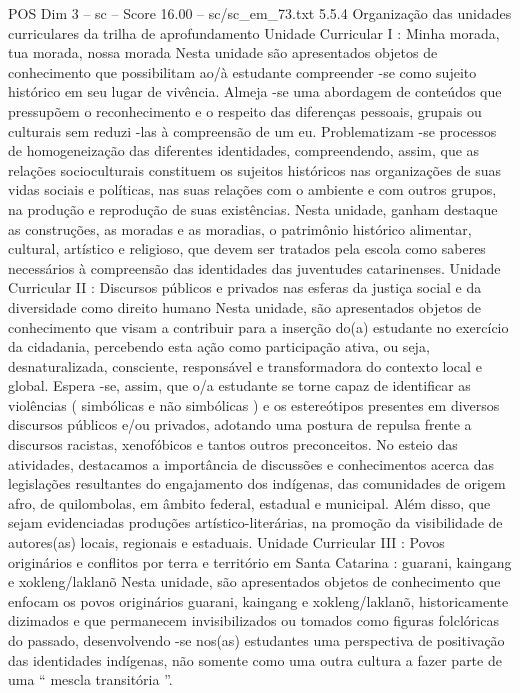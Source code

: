 \begin{textsample}{POS Dim 3 – sc – Score 16.00 – sc/sc\_em\_73.txt}  \label{ex:f3_pos_069}
5.5.4 Organização das unidades curriculares da trilha de aprofundamento Unidade Curricular I : Minha morada, tua morada, nossa morada Nesta unidade são apresentados objetos de conhecimento que possibilitam ao/à estudante compreender -se como sujeito histórico em seu lugar de vivência.
Almeja -se uma abordagem de conteúdos que pressupõem o reconhecimento e o respeito das diferenças pessoais, grupais ou culturais sem reduzi -las à compreensão de um eu.
Problematizam -se processos de homogeneização das diferentes identidades, compreendendo, assim, que as relações socioculturais constituem os sujeitos históricos nas organizações de suas vidas sociais e políticas, nas suas relações com o ambiente e com outros grupos, na produção e reprodução de suas existências.
Nesta unidade, ganham destaque as construções, as moradas e as moradias, o patrimônio histórico alimentar, cultural, artístico e religioso, que devem ser tratados pela escola como saberes necessários à compreensão das identidades das juventudes catarinenses.
Unidade Curricular II : Discursos públicos e privados nas esferas da justiça social e da diversidade como direito humano Nesta unidade, são apresentados objetos de conhecimento que visam a contribuir para a inserção do(a) estudante no exercício da cidadania, percebendo esta ação como participação ativa, ou seja, desnaturalizada, consciente, responsável e transformadora do contexto local e global.
Espera -se, assim, que o/a estudante se torne capaz de identificar as violências ( simbólicas e não simbólicas ) e os estereótipos presentes em diversos discursos públicos e/ou privados, adotando uma postura de repulsa frente a discursos racistas, xenofóbicos e tantos outros preconceitos.
No esteio das atividades, destacamos a importância de discussões e conhecimentos acerca das legislações resultantes do engajamento dos indígenas, das comunidades de origem afro, de quilombolas, em âmbito federal, estadual e municipal.
Além disso, que sejam evidenciadas produções artístico-literárias, na promoção da visibilidade de autores(as) locais, regionais e estaduais.
Unidade Curricular III : Povos originários e conflitos por terra e território em Santa Catarina : guarani, kaingang e xokleng/laklanõ Nesta unidade, são apresentados objetos de conhecimento que enfocam os povos originários guarani, kaingang e xokleng/laklanõ, historicamente dizimados e que permanecem invisibilizados ou tomados como figuras folclóricas do passado, desenvolvendo -se nos(as) estudantes uma perspectiva de positivação das identidades indígenas, não somente como uma outra cultura a fazer parte de uma “ mescla transitória ”.

\end{textsample}
